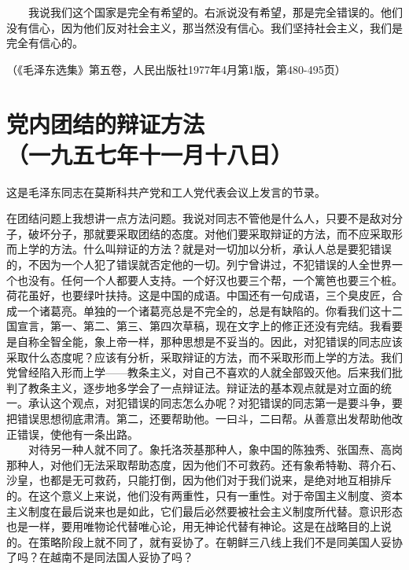 \documentclass[cn,11pt,chinese]{elegantbook}
\def\myformat#1{\hfil\hfil #1}
\begin{document}
　　我说我们这个国家是完全有希望的。右派说没有希望，那是完全错误的。他们没有信心，因为他们反对社会主义，那当然没有信心。我们坚持社会主义，我们是完全有信心的。\\
\begin{flushright}（《毛泽东选集》第五卷，人民出版社1977年4月第1版，第480-495页）\end{flushright}
\newpage\section*{\myformat{党内团结的辩证方法}\\\myformat{（一九五七年十一月十八日）}}
\begin{introduction}\item 这是毛泽东同志在莫斯科共产党和工人党代表会议上发言的节录。\end{introduction}
在团结问题上我想讲一点方法问题。我说对同志不管他是什么人，只要不是敌对分子，破坏分子，那就要采取团结的态度。对他们要采取辩证的方法，而不应采取形而上学的方法。什么叫辩证的方法？就是对一切加以分析，承认人总是要犯错误的，不因为一个人犯了错误就否定他的一切。列宁曾讲过，不犯错误的人全世界一个也没有。任何一个人都要人支持。一个好汉也要三个帮，一个篱笆也要三个桩。荷花虽好，也要绿叶扶持。这是中国的成语。中国还有一句成语，三个臭皮匠，合成一个诸葛亮。单独的一个诸葛亮总是不完全的，总是有缺陷的。你看我们这十二国宣言，第一、第二、第三、第四次草稿，现在文字上的修正还没有完结。我看要是自称全智全能，象上帝一样，那种思想是不妥当的。因此，对犯错误的同志应该采取什么态度呢？应该有分析，采取辩证的方法，而不采取形而上学的方法。我们党曾经陷入形而上学——教条主义，对自己不喜欢的人就全部毁灭他。后来我们批判了教条主义，逐步地多学会了一点辩证法。辩证法的基本观点就是对立面的统一。承认这个观点，对犯错误的同志怎么办呢？对犯错误的同志第一是要斗争，要把错误思想彻底肃清。第二，还要帮助他。一曰斗，二曰帮。从善意出发帮助他改正错误，使他有一条出路。\\
　　对待另一种人就不同了。象托洛茨基那种人，象中国的陈独秀、张国焘、高岗那种人，对他们无法采取帮助态度，因为他们不可救药。还有象希特勒、蒋介石、沙皇，也都是无可救药，只能打倒，因为他们对于我们说来，是绝对地互相排斥的。在这个意义上来说，他们没有两重性，只有一重性。对于帝国主义制度、资本主义制度在最后说来也是如此，它们最后必然要被社会主义制度所代替。意识形态也是一样，要用唯物论代替唯心论，用无神论代替有神论。这是在战略目的上说的。在策略阶段上就不同了，就有妥协了。在朝鲜三八线上我们不是同美国人妥协了吗？在越南不是同法国人妥协了吗？\\
\end{document}

